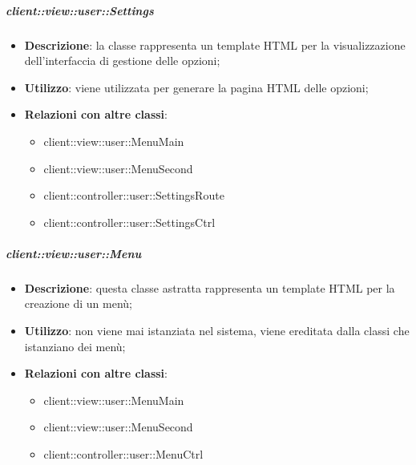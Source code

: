 		\subparagraph{client::view::user::Settings} %
		\label{subp:bdsm_app_client_view_user_settings}
			\begin{itemize}
				\item \textbf{Descrizione}: la classe rappresenta un template HTML per la visualizzazione dell'interfaccia di gestione delle opzioni;
				\item \textbf{Utilizzo}: viene utilizzata per generare la pagina HTML delle opzioni;
				\item \textbf{Relazioni con altre classi}:
					\begin{itemize}
						\item client::view::user::MenuMain
						\item client::view::user::MenuSecond
						\item client::controller::user::SettingsRoute
						\item client::controller::user::SettingsCtrl
					\end{itemize}
			\end{itemize}

		\subparagraph{client::view::user::Menu} %
		\label{subp:bdsm_app_client_view_user_menu}
			\begin{itemize}
				\item \textbf{Descrizione}: questa classe astratta rappresenta un template HTML per la creazione di un menù;
				\item \textbf{Utilizzo}: non viene mai istanziata nel sistema, viene ereditata dalla classi che istanziano dei menù;
				\item \textbf{Relazioni con altre classi}:
					\begin{itemize}
						\item client::view::user::MenuMain
						\item client::view::user::MenuSecond
						\item client::controller::user::MenuCtrl
					\end{itemize}
			\end{itemize}

